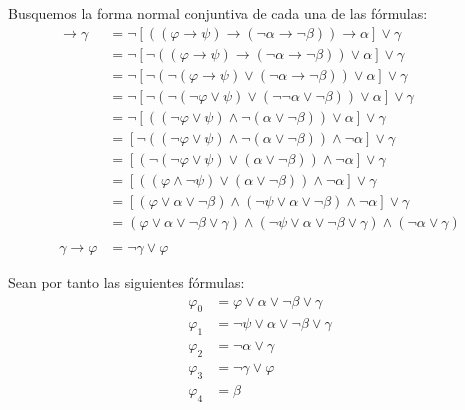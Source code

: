 \begin{ejercicio}
    Busquemos la forma normal conjuntiva de cada una de las fórmulas:
    \begin{align*}
        [\left((\varphi\rightarrow \psi)\rightarrow (\lnot \alpha\rightarrow\lnot \beta)\right)\rightarrow\alpha]\rightarrow \gamma
        &= \lnot \left[\left((\varphi\rightarrow \psi)\rightarrow (\lnot \alpha\rightarrow\lnot \beta)\right)\rightarrow\alpha\right]\lor \gamma\\
        &= \lnot \left[\lnot \left((\varphi\rightarrow \psi)\rightarrow (\lnot \alpha\rightarrow\lnot \beta)\right)\lor\alpha\right]\lor \gamma\\
        &= \lnot \left[\lnot \left(\lnot (\varphi\rightarrow \psi)\lor (\lnot \alpha\rightarrow\lnot \beta)\right)\lor\alpha\right]\lor \gamma\\
        &= \lnot \left[\lnot \left(\lnot (\lnot \varphi\lor \psi)\lor (\lnot\lnot \alpha \lor \lnot \beta)\right)\lor\alpha\right]\lor \gamma\\
        &= \lnot \left[ \left( (\lnot \varphi\lor \psi)\land \lnot (\alpha \lor \lnot \beta)\right)\lor\alpha\right]\lor \gamma\\
        &= [\lnot \left( (\lnot \varphi\lor \psi)\land \lnot (\alpha \lor \lnot \beta)\right) \land \lnot \alpha] \lor \gamma\\
        &= [\left( \lnot (\lnot \varphi\lor \psi)\lor (\alpha \lor \lnot \beta)\right) \land \lnot \alpha] \lor \gamma\\
        &= [\left((\varphi\land \lnot \psi)\lor (\alpha\lor \lnot \beta)\right) \land \lnot \alpha] \lor \gamma\\
        &= [(\varphi\lor \alpha\lor \lnot \beta)\land (\lnot \psi\lor \alpha\lor \lnot \beta) \land \lnot \alpha] \lor \gamma\\
        &= (\varphi\lor \alpha\lor \lnot \beta \lor \gamma)\land (\lnot \psi\lor \alpha\lor \lnot \beta\lor \gamma) \land (\lnot \alpha\lor \gamma)\\ \\
        \gamma\rightarrow\varphi
        &= \lnot \gamma\lor \varphi
    \end{align*}

    Sean por tanto las siguientes fórmulas:
    \begin{align*}
        \varphi_0 &= \varphi\lor \alpha\lor \lnot \beta \lor \gamma\\
        \varphi_1 &= \lnot \psi\lor \alpha\lor \lnot \beta\lor \gamma\\
        \varphi_2 &= \lnot \alpha\lor \gamma\\
        \varphi_3 &= \lnot \gamma\lor \varphi\\
        \varphi_4 &= \beta
    \end{align*}


\end{ejercicio}
